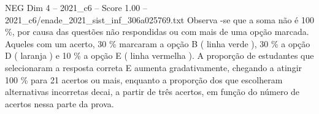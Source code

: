 \begin{textsample}{NEG Dim 4 – 2021\_c6 – Score 1.00 – 2021\_c6/enade\_2021\_sist\_inf\_306a025769.txt}
Observa -se que a soma não é 100 \%, por causa das questões não respondidas ou com mais de uma opção marcada.
Aqueles com um acerto, 30 \% marcaram a opção B ( linha verde ), 30 \% a opção D ( laranja ) e 10 \% a opção E ( linha vermelha ).
A proporção de estudantes que selecionaram a resposta correta E aumenta gradativamente, chegando a atingir 100 \% para 21 acertos ou mais, enquanto a proporção dos que escolheram alternativas incorretas decai, a partir de três acertos, em função do número de acertos nessa parte da prova.

\end{textsample}
